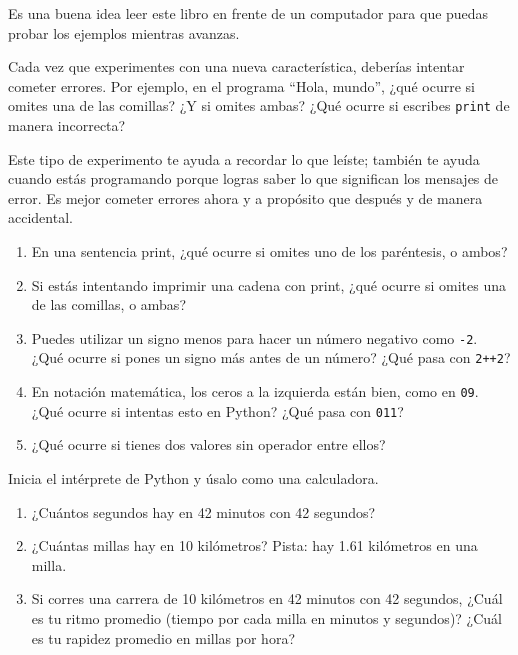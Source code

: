 \documentclass[10pt]{book}
\begin{document}
\begin{exercise}

Es una buena idea leer este libro en frente de un computador para que puedas
probar los ejemplos mientras avanzas.

Cada vez que experimentes con una nueva característica, deberías intentar
cometer errores.  Por ejemplo, en el programa ``Hola, mundo'',
¿qué ocurre si omites una de las comillas?  ¿Y
si omites ambas?  ¿Qué ocurre si escribes {\tt print} de manera incorrecta?

Este tipo de experimento te ayuda a recordar lo que leíste; también
te ayuda cuando estás programando porque logras saber lo que significan los
mensajes de error.  Es mejor cometer errores ahora y a propósito que
después y de manera accidental.

\begin{enumerate}

\item En una sentencia print, ¿qué ocurre si omites uno
de los paréntesis, o ambos?

\item Si estás intentando imprimir una cadena con print, ¿qué ocurre si
omites una de las comillas, o ambas?

\item Puedes utilizar un signo menos para hacer un número negativo como
{\tt -2}.  ¿Qué ocurre si pones un signo más antes de un número?
¿Qué pasa con {\tt 2++2}?

\item En notación matemática, los ceros a la izquierda están bien, como en {\tt 09}.
¿Qué ocurre si intentas esto en Python?  ¿Qué pasa con {\tt 011}?

\item ¿Qué ocurre si tienes dos valores sin operador
entre ellos?

\end{enumerate}

\end{exercise}



\begin{exercise}

Inicia el intérprete de Python y úsalo como una calculadora.

\begin{enumerate}

\item ¿Cuántos segundos hay en 42 minutos con 42 segundos?

\item ¿Cuántas millas hay en 10 kilómetros?  Pista: hay 1.61
  kilómetros en una milla.

\item Si corres una carrera de 10 kilómetros en 42 minutos con 42 segundos,
  ¿Cuál es tu ritmo promedio (tiempo por cada milla en minutos y segundos)?  ¿Cuál
  es tu rapidez promedio en millas por hora?


\end{enumerate}

\end{exercise}
\end{document}
